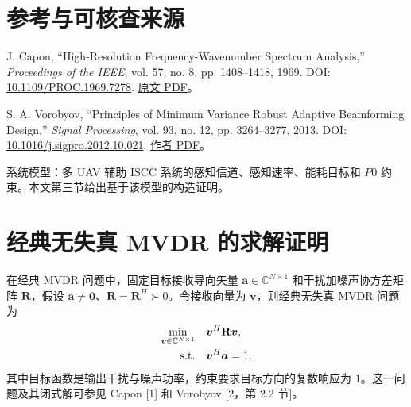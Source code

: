 \documentclass[11pt,a4paper]{ctexart}
\begin{document}
\section*{参考与可核查来源}
\begin{enumerate}[label={[\arabic*]},leftmargin=*]
\item J. Capon, “High-Resolution Frequency-Wavenumber Spectrum Analysis,” \textit{Proceedings of the IEEE}, vol. 57, no. 8, pp. 1408--1418, 1969. DOI: \href{https://doi.org/10.1109/PROC.1969.7278}{10.1109/PROC.1969.7278}. \href{https://epsc.wustl.edu/~ggeuler/reading/cam_noise_biblio/capon_1969-ieee-high-resolution_frequency-wavenumber_spectrum_analysis.pdf}{原文 PDF}。
\item S. A. Vorobyov, “Principles of Minimum Variance Robust Adaptive Beamforming Design,” \textit{Signal Processing}, vol. 93, no. 12, pp. 3264--3277, 2013. DOI: \href{https://doi.org/10.1016/j.sigpro.2012.10.021}{10.1016/j.sigpro.2012.10.021}. \href{https://users.aalto.fi/~vorobys1/SP13.pdf}{作者 PDF}。
\item 系统模型：多 UAV 辅助 ISCC 系统的感知信道、感知速率、能耗目标和 $P0$ 约束。本文第三节给出基于该模型的构造证明。
\end{enumerate}
\clearpage
\appendix
\section{经典无失真 MVDR 的求解证明}\label{app:classic}
在经典 MVDR 问题中，固定目标接收导向矢量 $\bm a\in\mathbb C^{N\times1}$ 和干扰加噪声协方差矩阵 $\mathbf R$，假设 $\bm a\ne\bm0$、$\mathbf R=\mathbf R^H\succ0$。令接收向量为 $\bm v$，则经典无失真 MVDR 问题为
\begin{align}\label{eq:app-mvdr-problem}
\min_{\bm v\in\mathbb C^{N\times1}}\quad
&\bm v^H\mathbf R\bm v,\\
\text{s.t.}\quad &\bm v^H\bm a=1.\notag
\end{align}
其中目标函数是输出干扰与噪声功率，约束要求目标方向的复数响应为 $1$。这一问题及其闭式解可参见 Capon [1] 和 Vorobyov [2，第 2.2 节]。
\end{document}
